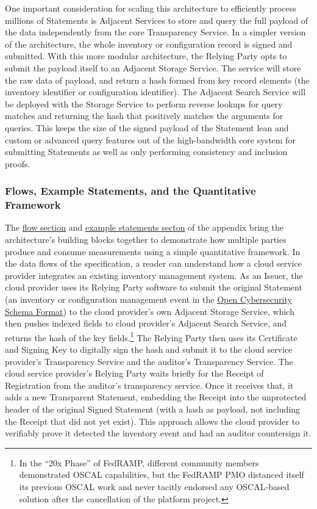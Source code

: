 \documentclass{jdf}
\begin{document}
One important consideration for scaling this architecture to efficiently process millions of Statements is Adjacent Services to store and query the full payload of the data independently from the core Transparency Service. In a simpler version of the architecture, the whole inventory or configuration record is signed and submitted. With this more modular architecture, the Relying Party opts to submit the payload itself to an Adjacent Storage Service. The service will store the raw data of payload, and return a hash formed from key record elements (the inventory identifier or configuration identifier). The Adjacent Search Service will be deployed with the Storage Service to perform reverse lookups for query matches and returning the hash that positively matches the arguments for queries. This keeps the size of the signed payload of the Statement lean and custom or advanced query features out of the high-bandwidth core system for submitting Statements as well as only performing consistency and inclusion proofs.

\subsubsection{Flows, Example Statements, and the Quantitative Framework}

The \href{https://github.com/aj-stein/practicum/pull/1}{flow section} and \href{https://aj-stein.github.io/conmotion/architecture.html#example-statements}{example statements secton} of the appendix bring the architecture's building blocks together to demonstrate how multiple parties produce and consume measurements using a simple quantitative framework. In the data flows of the specification, a reader can understand how a cloud service provider integrates an existing inventory management system. As an Issuer, the cloud provider uses its Relying Party software to submit the original Statement (an inventory or configuration management event in the \href{https://schema.ocsf.io/}{Open Cybersecurity Schema Format}) to the cloud provider's own Adjacent Storage Service, which then pushes indexed fields to cloud provider's Adjacent Search Service, and returns the hash of the key fields.\footnote{In the ``20x Phase'' of FedRAMP, different community members demonstrated OSCAL capabilities, but the FedRAMP PMO distanced itself its previous OSCAL work and never tacitly endorsed any OSCAL-based solution after the cancellation of the platform project.} The Relying Party then uses its Certificate and Signing Key to digitally sign the hash and submit it to the cloud service provider's Transparency Service and the auditor's Transparency Service. The cloud service provider's Relying Party waits briefly for the Receipt of Registration from the auditor's transparency service. Once it receives that, it adds a new Transparent Statement, embedding the Receipt into the unprotected header of the original Signed Statement (with a hash as payload, not including the Receipt that did not yet exist). This approach allows the cloud provider to verifiably prove it detected the inventory event and had an auditor countersign it. 
\end{document}
